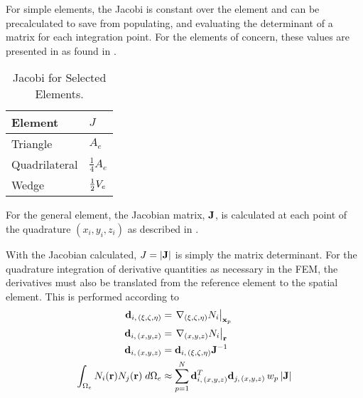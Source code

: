     For simple elements, the Jacobi is constant over the element and can be
    precalculated to save from populating, and evaluating the 
    determinant of a matrix for each integration point. For the elements of 
    concern, these values are presented in  as found in 
    \cite{textbookcolorado}.
    \begin{table}
      \caption{Jacobi for Selected Elements.}
      \label{tab:jacobi}
      \begin{center}
        \begin{tabular}{ll}
          \toprule
          Element & $J$ \\
          \midrule
          Triangle      & $A_e$ \\
          Quadrilateral & $\frac{1}{4} A_e$ \\
          Wedge         & $\frac{1}{2} V_e$ \\
          \bottomrule
        \end{tabular}
      \end{center}
    \end{table}

    For the general element, the Jacobian matrix, $\mathbf{J}$, is calculated at each
    point of the quadrature $(x_i,y_i,z_i)$ as described in
    .

    With the Jacobian calculated, $J=\lvert\mathbf{J}\rvert$ is simply the matrix 
    determinant. For the quadrature integration of derivative quantities as
    necessary in the FEM, the derivatives must also be translated from the
    reference element to the spatial element. This is performed according to 
    \begin{align}
      \mathbf{d}_{i,\,(\xi,\zeta,\eta)} &= \left. \mathbf{\nabla}_{(\xi,\zeta,\eta)} N_i
        \right|_{\mathbf{x}_p}\\
      \mathbf{d}_{i,\,(x,y,z)} &= \left. \mathbf{\nabla}_{(x,y,z)} N_i \right|_{\mathbf{r}} \\
      \mathbf{d}_{i,\,(x,y,z)} &= \mathbf{d}_{i,\,(\xi,\zeta,\eta)} \mathbf{J}^{-1} \\
      \label{eq:deriv_integral}
      \int_{\Omega_e} N_i(\mathbf{r}) N_j(\mathbf{r}) \; d\Omega_e &\approx
      \sum_{p=1}^{N}
      \mathbf{d}_{i,\,(x,y,z)}^{T} \mathbf{d}_{j,\,(x,y,z)} \, w_p \, \lvert \mathbf{J} \rvert
    \end{align}


